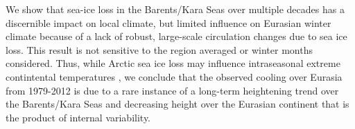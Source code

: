\documentclass{nature}
\begin{document}
We show that sea-ice loss in the Barents/Kara Seas over multiple decades has a discernible impact on local climate, but limited influence on Eurasian winter climate because of a lack of robust, large-scale circulation changes due to sea ice loss. This result is not sensitive to the region averaged or winter months considered. Thus, while Arctic sea ice loss may influence intraseasonal extreme contintental temperatures \cite{kug15}, we conclude that the observed cooling over Eurasia from 1979-2012 is due to a rare instance of a long-term heightening trend over the Barents/Kara Seas and decreasing height over the Eurasian continent that is the product of internal variability. %




\end{document}
